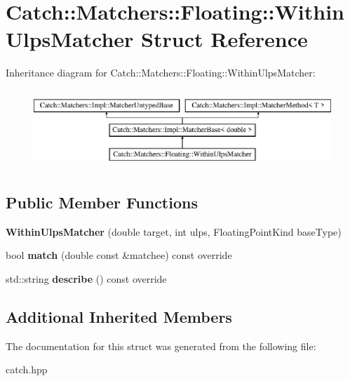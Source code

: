 \hypertarget{structCatch_1_1Matchers_1_1Floating_1_1WithinUlpsMatcher}{}\section{Catch\+::Matchers\+::Floating\+::Within\+Ulps\+Matcher Struct Reference}
\label{structCatch_1_1Matchers_1_1Floating_1_1WithinUlpsMatcher}
Inheritance diagram for Catch\+::Matchers\+::Floating\+::Within\+Ulps\+Matcher\+:\begin{figure}[H]
\begin{center}
\leavevmode
\includegraphics[height=2.968198cm]{structCatch_1_1Matchers_1_1Floating_1_1WithinUlpsMatcher}
\end{center}
\end{figure}
\subsection*{Public Member Functions}
\begin{DoxyCompactItemize}
\item 
\mbox{\label{structCatch_1_1Matchers_1_1Floating_1_1WithinUlpsMatcher_a836074ae4010275284ab66b2485c6575}} 
{\bfseries Within\+Ulps\+Matcher} (double target, int ulps, Floating\+Point\+Kind base\+Type)
\item 
\mbox{\label{structCatch_1_1Matchers_1_1Floating_1_1WithinUlpsMatcher_aabda42a0dc5d00f3c5916feb75006b32}} 
bool {\bfseries match} (double const \&matchee) const override
\item 
\mbox{\label{structCatch_1_1Matchers_1_1Floating_1_1WithinUlpsMatcher_ad9bc8bb7f3abd326580a4bf6cf369b1b}} 
std\+::string {\bfseries describe} () const override
\end{DoxyCompactItemize}
\subsection*{Additional Inherited Members}


The documentation for this struct was generated from the following file\+:\begin{DoxyCompactItemize}
\item 
catch.\+hpp\end{DoxyCompactItemize}
